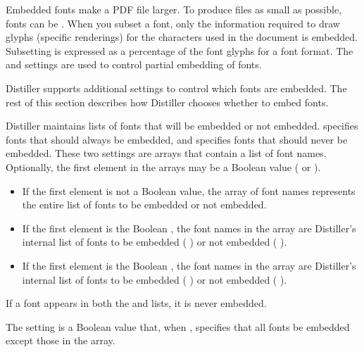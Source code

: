 \documentclass[letterpaper,12pt,english,openany,oneside]{sphinxmanual}
\begin{document}
Embedded fonts make a PDF file larger. To produce files as small as possible, fonts can be  . When you subset a font, only the information required to draw glyphs (specific renderings) for the characters used in the document is embedded. Subsetting is expressed as a percentage of the font glyphs for a font format. The  and  settings are used to control partial embedding of fonts.

Distiller supports additional settings to control which fonts are embedded. The rest of this section describes how Distiller chooses whether to embed fonts.

Distiller maintains lists of fonts that will be embedded or not embedded.  specifies fonts that should always be embedded, and  specifies fonts that should never be embedded. These two settings are arrays that contain a list of font names. Optionally, the first element in the arrays may be a Boolean value ( or  ).
\begin{itemize}
\item {} 
If the first element is not a Boolean value, the array of font names represents the entire list of fonts to be embedded or not embedded.

\item {} 
If the first element is the Boolean  , the font names in the array are  Distiller’s internal list of fonts to be embedded ( ) or not embedded ( ).

\item {} 
If the first element is the Boolean  , the font names in the array are  Distiller’s internal list of fonts to be embedded ( ) or not embedded ( ).

\end{itemize}

If a font appears in both the  and  lists, it is never embedded.

The  setting is a Boolean value that, when  , specifies that all fonts be embedded except those in the  array.
\end{document}
